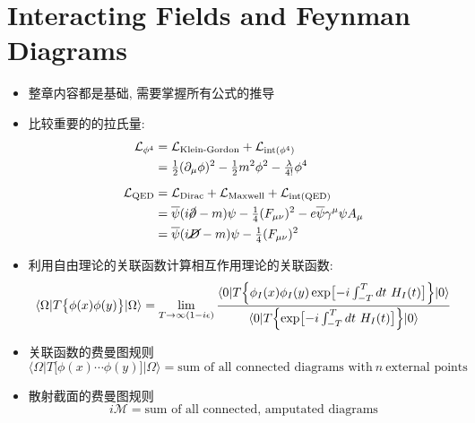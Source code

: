 \chapter{Interacting Fields and Feynman Diagrams}

\begin{itemize}
  \item 整章内容都是基础, 需要掌握所有公式的推导
  \item 比较重要的的拉氏量:
        \begin{align*}
          \mathcal{L}_{\phi^4}        & = \mathcal{L}_{\text{Klein-Gordon}} + \mathcal{L}_{\text{int(}\phi^4\text{)}}                                                      \\
                                      & = \tfrac{1}{2}(\partial_\mu \phi)^2 - \tfrac{1}{2}m^2\phi^2 - \tfrac{\lambda}{4!}\phi^4                                            \\[0.2cm]
          \mathcal{L}_{\text{QED}}    & = \mathcal{L}_{\text{Dirac}} + \mathcal{L}_{\text{Maxwell}} + \mathcal{L}_{\text{int(QED)}}                                        \\
                                      & = \overline{\psi}(i\cancel{\partial}-m)\psi - \tfrac{1}{4}(F_{\mu\nu})^2 - e\overline{\psi}\gamma^{\mu}\psi A_{\mu}                \\
                                      & = \overline{\psi}(i\cancel{D}-m)\psi - \tfrac{1}{4}(F_{\mu\nu})^2                                                                  %
        \end{align*}
  \item 利用自由理论的关联函数计算相互作用理论的关联函数:
        \begin{equation*}
          \langle \Omega|T \bigl\{\phi(x)\phi(y)\bigr\}|\Omega \rangle = \lim_{T\rightarrow \infty(1-i\epsilon)}\frac{\langle 0|T \Bigl\{\phi_I(x)\phi_I(y)\exp\bigl[-i\int_{-T}^{T}dt\ H_I(t)\bigr]\Bigr\}|0 \rangle}{\langle 0|T \Bigl\{\exp\bigl[-i\int_{-T}^{T}dt\ H_I(t)\bigr]\Bigr\}|0 \rangle}
        \end{equation*}
  \item 关联函数的费曼图规则
        \begin{equation*}
          \langle \Omega|T \bigl[\phi(x)\cdots\phi(y)\bigr]|\Omega \rangle = \text{sum of all connected diagrams with}\ n\ \text{external points}
        \end{equation*}
  \item 散射截面的费曼图规则
        \begin{equation*}
          i\mathcal{M} = \text{sum of all connected, amputated diagrams}
        \end{equation*}

\end{itemize}
\pagestyle{general}

